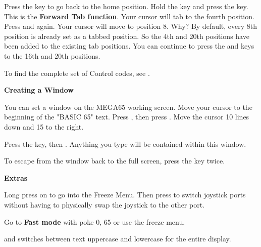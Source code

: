 Press the  key to go back to the home position. Hold the  key and press the  key. This is the \textbf{Forward Tab function}. Your cursor will tab to the fourth position. Press  and  again. Your cursor will move to position 8. Why? By default, every 8th position is already set as a tabbed position. So the 4th and 20th positions have been added to the existing tab positions. You can continue to press the  and  keys to the 16th and 20th positions.

To find the complete set of Control codes, see .

\textbf{Creating a Window}

You can set a window on the MEGA65 working screen. Move your cursor to the beginning of the "BASIC 65" text. Press , then press . Move the cursor 10 lines down and 15 to the right.

Press the  key, then . Anything you type will be contained within this window.

To escape from the window back to the full screen, press the  key twice.


\textbf{Extras}

Long press on  to go into the Freeze Menu.  Then press  to switch joystick ports without having to physically swap the joystick to the other port.

Go to \textbf{Fast mode} with poke 0, 65 or use the freeze menu.

 and  switches between text uppercase and lowercase for the entire display.
